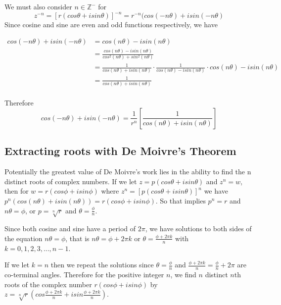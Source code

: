 \documentclass{article}
\begin{document}
We must also consider \(n \in \mathds{Z}^-\) for \[z^{-n} = \left[r(cos\theta + isin\theta)\right]^{-n} = r^{-n}(cos{(-n\theta)} + isin{(-n\theta)}\]
Since cosine and sine are even and odd functions respectively, we have 

\begin{align*}
    cos{(-n\theta)} + isin{(-n\theta)} &= cos{(n\theta)} - isin{(n\theta)}  \\ 
                                       &= \frac{cos{(n\theta)} - isin{(n\theta)}} {cos^2{(n\theta)} + sin^2{(n\theta)}} \\
                                       &= \frac{1}{cos{(n\theta)} + isin{(n\theta)}} \cdot \frac{1}{cos{(n\theta)} - isin{(n\theta)}} \cdot cos{(n\theta)} - isin{(n\theta)} \\
                                       &= \frac{1}{cos{(n\theta)} + isin{(n\theta)}} \\ 
\end{align*}

Therefore \[cos{(-n\theta)} + isin{(-n\theta)} = \frac{1}{r^n}\left[\frac{1}{cos{(n\theta)} + isin{(n\theta)}}\right]\] 

\subsection{Extracting roots with De Moivre's Theorem}\cite[p.$\Tilde{18}$]{schneider2011moivre}  

Potentially the greatest value of De Moivre's work lies in the ability to find the n distinct roots of complex numbers. If we let $z = p(cos\theta + isin\theta)$ and $z^n = w$, then for $w = r(cos\phi + isin\phi)$ where $z^n = \left[p(cos\theta + isin\theta)\right]^n$ we have $p^n(cos{(n\theta)} + isin{(n\theta)}) = r(cos\phi + isin\phi)$. So that implies $p^n = r$ and $n\theta = \phi$, or $p = \sqrt[n]{r}$ and $\theta = \frac{\phi}{n}$. 
\vspace{.1cm}

Since both cosine and sine have a period of \(2\pi\), we have solutions to both sides of the equation \(n\theta = \phi\), that is \(n\theta = \phi + {2\pi}k\) or \(\theta = \frac{\phi + {2\pi}k}{n}\) with $k = 0,1,2,3,...,n-1$. 
\vspace{.1cm}

If we let $k = n$ then we repeat the solutions since \(\theta = \frac{\phi}{n}\) and \(\frac{\phi + {2\pi}k}{n} = \frac{\phi}{n} + 2\pi\) are co-terminal angles. Therefore for the positive integer \(n\), we find \(n\) distinct \(n\)th roots of the complex number \(r(cos\phi + isin\phi)\) by $z = \sqrt[n]{r}\left(cos\frac{\phi + {2\pi}k}{n} + isin\frac{\phi + {2\pi}k}{n}\right)$. 
\vspace{.1cm}
\end{document}
